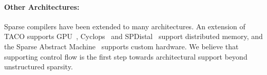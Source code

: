 \paragraph{Other Architectures:} 

Sparse compilers have been extended to many architectures. An extension of TACO supports GPU~\cite{senanayake2020sparse}, Cyclops~\cite{solomonik_cyclops_2013,solomonik_sparse_2015} and SPDistal~\cite{yadav_spdistal_2022-1} support distributed memory, and the Sparse Abstract Machine~\cite{hsu_sparse_2022} supports custom hardware.
We believe that supporting control flow is the first step towards architectural support beyond unstructured sparsity.

%




